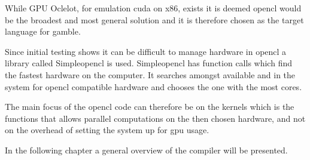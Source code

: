 While GPU Oclelot, for emulation \gls{cuda} on x86, exists it is deemed \gls{opencl} would be the broadest and most general solution and it is therefore chosen as the target language for \gls{gamble}.

Since initial testing shows it can be difficult to manage hardware in \gls{opencl} a library called Simple\gls{opencl} is used.
Simple\gls{opencl} has function calls which find the fastest hardware on the computer.
It searches amongst available  and  in the system for \gls{opencl} compatible hardware and chooses the one with the most cores. \citep{simpleCL}

The main focus of the \gls{opencl} code can therefore be on the kernels which is the functions that allows parallel computations on the then chosen hardware, and not on the overhead of setting the system up for \acrshort{gpu} usage.

In the following chapter a general overview of the compiler will be presented.
